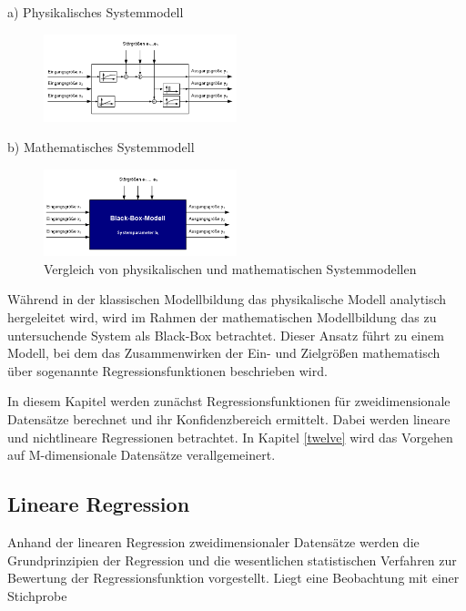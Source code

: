 \clearpage

\noindent a) Physikalisches Systemmodell 

\noindent 
\begin{figure}[H]
  \centerline{\includegraphics[width=0.5\textwidth]{Kapitel12/Bilder/image2-1}}
\end{figure}

b) Mathematisches Systemmodell

\noindent 
\begin{figure}[H]
  \centerline{\includegraphics[width=0.5\textwidth]{Kapitel12/Bilder/image2-2}}
  \caption{Vergleich von physikalischen und mathematischen Systemmodellen}
  \label{fig:BlackboxModell}
\end{figure}

\noindent W\"{a}hrend in der klassischen Modellbildung das physikalische Modell analytisch hergeleitet wird, wird im Rahmen der mathematischen Modellbildung das zu untersuchende System als Black-Box betrachtet. Dieser Ansatz f\"{u}hrt zu einem Modell, bei dem das Zusammenwirken der Ein- und Zielgr\"{o}{\ss}en mathematisch \"{u}ber sogenannte Regressionsfunktionen beschrieben wird.\newline

\noindent In diesem Kapitel werden zun\"{a}chst Regressionsfunktionen f\"{u}r zweidimensionale Datens\"{a}tze berechnet und ihr Konfidenzbereich ermittelt. Dabei werden lineare und nichtlineare Regressionen betrachtet. In Kapitel \ref{twelve} wird das Vorgehen auf M-dimensionale Datens\"{a}tze verallgemeinert.

\subsection{Lineare Regression}

\noindent Anhand der linearen Regression zweidimensionaler Datens\"{a}tze werden die Grundprinzipien der Regression und die wesentlichen statistischen Verfahren zur Bewertung der Regressionsfunktion vorgestellt. Liegt eine Beobachtung mit einer Stichprobe

